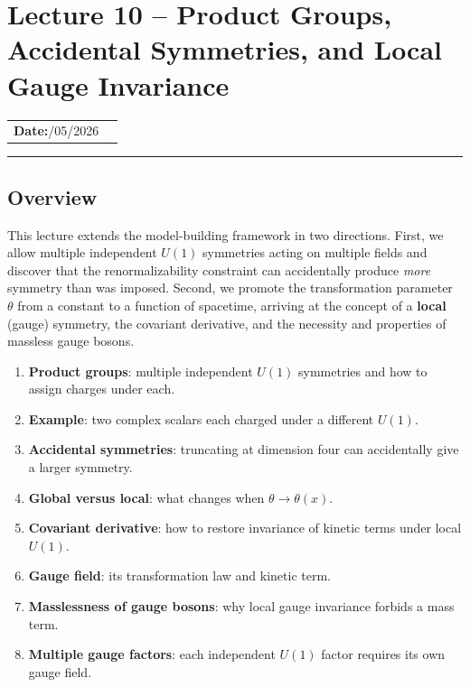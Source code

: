 \documentclass[../main.tex]{subfiles}
\begin{document}
\section{Lecture 10 -- Product Groups, Accidental Symmetries, and Local Gauge Invariance}\label{sec:lec10}
\begin{center}
\begin{tabular}{ll}
  \textbf{Date:}\quad 10/05/2026 & \\
\end{tabular}
\end{center}
\hrule\vspace{1.5em}

\subsection*{Overview}

This lecture extends the model-building framework in two directions.  First, we allow multiple independent $U(1)$ symmetries acting on multiple fields and discover that the renormalizability constraint can accidentally produce \emph{more} symmetry than was imposed.  Second, we promote the transformation parameter $\theta$ from a constant to a function of spacetime, arriving at the concept of a \textbf{local} (gauge) symmetry, the covariant derivative, and the necessity and properties of massless gauge bosons.

\begin{enumerate}
  \item \textbf{Product groups}: multiple independent $U(1)$ symmetries and how to assign charges under each.
  \item \textbf{Example}: two complex scalars each charged under a different $U(1)$.
  \item \textbf{Accidental symmetries}: truncating at dimension four can accidentally give a larger symmetry.
  \item \textbf{Global versus local}: what changes when $\theta\to\theta(x)$.
  \item \textbf{Covariant derivative}: how to restore invariance of kinetic terms under local $U(1)$.
  \item \textbf{Gauge field}: its transformation law and kinetic term.
  \item \textbf{Masslessness of gauge bosons}: why local gauge invariance forbids a mass term.
  \item \textbf{Multiple gauge factors}: each independent $U(1)$ factor requires its own gauge field.
\end{enumerate}
\end{document}
